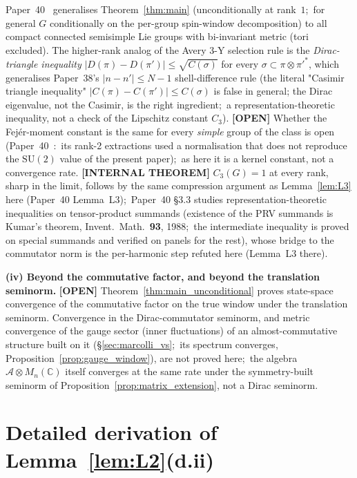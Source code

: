 \documentclass[11pt,a4paper]{article}
\theoremstyle{plain}
\theoremstyle{definition}
\newcommand{\SU}{\mathrm{SU}}
\newcommand{\gvc}[2]{#2}
\begin{document}
\gvc{p40-general-g-conditional}{Paper~40~\cite{paper40_unified} generalises
Theorem~\ref{thm:main} (unconditionally at rank~$1$;\ for general $G$
conditionally on the per-group spin-window decomposition) to all compact connected semisimple Lie groups
with bi-invariant metric (tori excluded)}. The higher-rank analog of the Avery 3-Y selection
rule is the \emph{Dirac-triangle inequality}
$|D(\pi) - D(\pi')| \le \sqrt{C(\sigma)}$ for every
$\sigma \subset \pi \otimes \pi'^*$, which generalises Paper~38's
$|n - n'| \le N - 1$ shell-difference rule (the literal "Casimir
triangle inequality" $|C(\pi) - C(\pi')| \le C(\sigma)$ is false in
general; the Dirac eigenvalue, not the Casimir, is the right
ingredient;\ a representation-theoretic inequality, not a check of the
Lipschitz constant $C_3$). \textbf{[OPEN]} Whether the Fej\'er-moment
constant is the same for every \emph{simple} group of the class is open
(Paper~40~\cite{paper40_unified}:\ its rank-2 extractions used a
normalisation that does not reproduce the $\SU(2)$ value of the present
paper);\ as here it is a kernel constant, not a convergence rate.
\textbf{[INTERNAL THEOREM]}
\gvc{lipschitz-c3-compression}{$C_3(G) = 1$ at every rank, sharp in the limit, follows by the same
compression argument as Lemma~\ref{lem:L3} here (Paper~40 Lemma~L3)};\
Paper~40 \S 3.3 studies representation-theoretic
inequalities on tensor-product summands (existence of the PRV summands is
Kumar's theorem, Invent.\ Math.\ \textbf{93}, 1988;\ the intermediate
inequality is proved on special summands and verified on panels for the
rest), whose bridge to the commutator norm is the per-harmonic step refuted here
(Lemma~L3 there).

\textbf{(iv) Beyond the commutative factor, and beyond the translation
seminorm.} \textbf{[OPEN]} Theorem~\ref{thm:main_unconditional} proves
state-space convergence of the commutative factor on the true window
under the translation seminorm.  Convergence in the Dirac-commutator
seminorm, and metric convergence of the gauge sector (inner fluctuations)
of an almost-commutative structure built on it (\S\ref{sec:marcolli_vs};\
its spectrum converges, Proposition~\ref{prop:gauge_window}), are
not proved here;\ the algebra $\mathcal{A} \otimes M_n(\mathbb{C})$
itself converges at the same rate under the symmetry-built seminorm of
Proposition~\ref{prop:matrix_extension}, not a Dirac seminorm.

\appendix
\section{Detailed derivation of Lemma~\ref{lem:L2}(d.ii)}
\label{app:stein_weiss}
\end{document}
